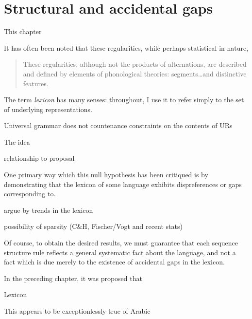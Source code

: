 \chapter{Structural and accidental gaps} \label{clusters}

This chapter 

It has often been noted that these regularities, while perhaps statistical in nature, 

\begin{quote}
These regularities, although not the products of alternations, are described and defined by elements of phonological theories: segments\ldots{}and distinctive features. \citep[13]{Berkley2000}
\end{quote}

The term \emph{lexicon} has many senses: throughout, I use it to refer simply to the set of underlying representations.

\begin{example}
Universal grammar does not countenance constraints on the contents of URs
\end{example}

The idea 

relationship to proposal

One primary way which this null hypothesis has been critiqued is by demonstrating that the lexicon of some language 
exhibits dispreferences or gaps corresponding to.

argue by trends in the lexicon

possibility of sparsity (C\&H, Fischer/Vogt and recent stats)

Of course, to obtain the desired results, we must guarantee that each sequence structure rule reflects a general systematic fact about the language, and not a fact which is due merely to the existence of accidental gaps in the lexicon. \citep[][401, fn.~8]{Stanley1967}

In the preceding chapter, it was proposed that 

Lexicon

This appears to be exceptionlessly true of Arabic


